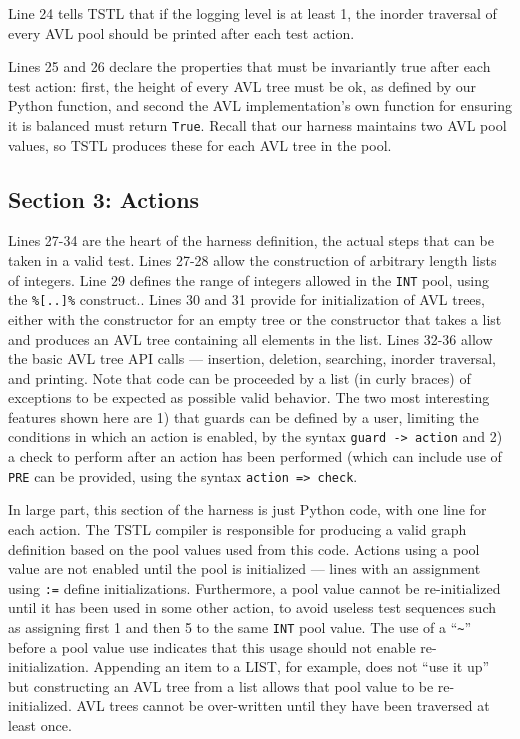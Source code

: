 \documentclass{sig-alternate}
\begin{document}
Line 24 tells TSTL that if the logging level is at least 1, the
inorder traversal of every AVL pool should be printed after each test
action.

Lines 25 and 26 declare the properties that must be invariantly true
after each test action: first, the height of every AVL tree must be
ok, as defined by our Python function, and second the AVL
implementation's own function for ensuring it is balanced must return
{\tt True}.  Recall that our harness maintains two AVL pool values, so
TSTL produces these for each AVL tree in the pool.

\subsection{Section 3: Actions}
\label{sec:actions}

Lines 27-34 are the heart of the harness definition, the actual steps
that can be taken in a valid test.  Lines 27-28 allow the construction
of arbitrary length lists of integers.  Line 29 defines the range of
integers allowed in the {\tt INT} pool, using the {\tt \%[..]\%}
construct..  Lines 30 and 31 provide for initialization of AVL trees,
either with the constructor for an empty tree or the constructor that
takes a list and produces an AVL tree containing all elements in the
list.  Lines 32-36 allow the basic AVL tree API calls --- insertion,
deletion, searching, inorder traversal, and printing.  Note that code can be
proceeded by a list (in curly braces) of exceptions to be expected as possible valid
behavior.  The two most interesting features shown here are 1) that
guards can be defined by a user, limiting the conditions in which an
action is enabled, by the syntax {\tt guard -> action} and 2) a check
to perform after an action has been performed (which can include use
of {\tt PRE} can be provided, using the syntax {\tt action => check}.

In large part, this section of the harness is just Python
code, with one line for each action.  The TSTL compiler is responsible
for producing a valid graph definition based on the pool values used
from this code.  Actions using a pool value are not enabled until the
pool is initialized --- lines with an assignment using {\tt :=} define
initializations.  Furthermore, a pool value cannot be re-initialized
until it has been used in some other action, to avoid useless test
sequences such as assigning first 1 and then 5 to the same {\tt INT}
pool value.  The use of a ``\verb|~|'' before a pool value use indicates that
this usage should not enable re-initialization.  Appending an item to
a LIST, for example, does not ``use it up'' but constructing an AVL
tree from a list allows that pool value to be re-initialized.  AVL
trees cannot be over-written until they have been traversed at least
once.
\end{document}
